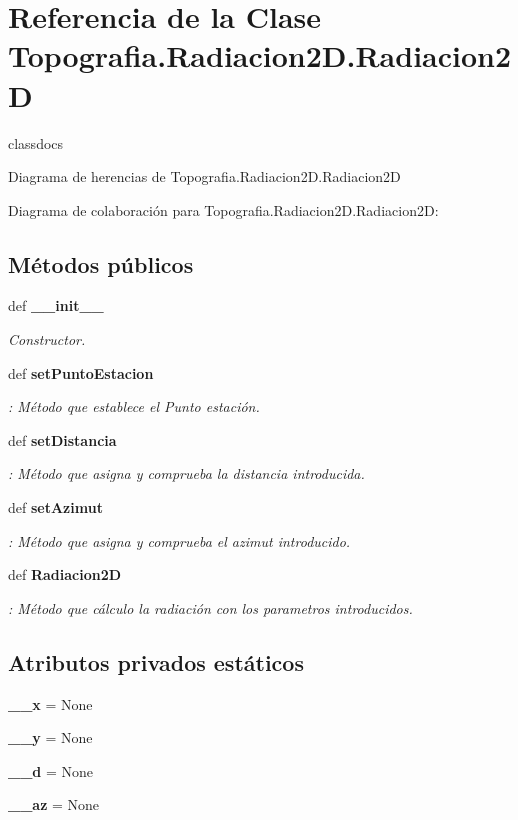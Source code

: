 \section{Referencia de la Clase Topografia.\-Radiacion2\-D.\-Radiacion2\-D}
\label{classTopografia_1_1Radiacion2D_1_1Radiacion2D}


classdocs  




Diagrama de herencias de Topografia.\-Radiacion2\-D.\-Radiacion2\-D


Diagrama de colaboración para Topografia.\-Radiacion2\-D.\-Radiacion2\-D\-:
\subsection*{Métodos públicos}
\begin{DoxyCompactItemize}
\item 
def {\bf \-\_\-\-\_\-init\-\_\-\-\_\-}
\begin{DoxyCompactList}\small\item\em Constructor. \end{DoxyCompactList}\item 
def {\bf set\-Punto\-Estacion}
\begin{DoxyCompactList}\small\item\em \-: Método que establece el Punto estación. \end{DoxyCompactList}\item 
def {\bf set\-Distancia}
\begin{DoxyCompactList}\small\item\em \-: Método que asigna y comprueba la distancia introducida. \end{DoxyCompactList}\item 
def {\bf set\-Azimut}
\begin{DoxyCompactList}\small\item\em \-: Método que asigna y comprueba el azimut introducido. \end{DoxyCompactList}\item 
def {\bf Radiacion2\-D}
\begin{DoxyCompactList}\small\item\em \-: Método que cálculo la radiación con los parametros introducidos. \end{DoxyCompactList}\end{DoxyCompactItemize}
\subsection*{Atributos privados estáticos}
\begin{DoxyCompactItemize}
\item 
{\bf \-\_\-\-\_\-x} = None
\item 
{\bf \-\_\-\-\_\-y} = None
\item 
{\bf \-\_\-\-\_\-d} = None
\item 
{\bf \-\_\-\-\_\-az} = None
\end{DoxyCompactItemize}


